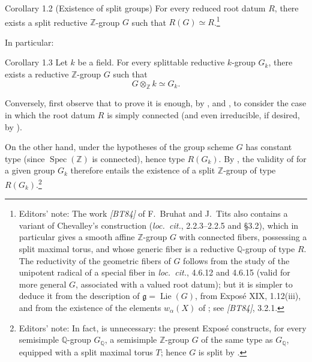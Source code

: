 \begin{sgastatement}{Corollary 1.2 (Existence of split groups)}
For every reduced root datum \(R\), there exists a split reductive
\(\mathbb Z\)-group \(G\) such that \(R(G)\simeq R\).\footnote{Editors' note:
The work \emph{[BT84]} of F.~Bruhat and J.~Tits also contains a variant of
Chevalley's construction (\emph{loc.\ cit.}, 2.2.3--2.2.5 and \S3.2), which
in particular gives a smooth affine \(\mathbb Z\)-group \(G\) with connected
fibers, possessing a split maximal torus, and whose generic fiber is a reductive
\(\mathbb Q\)-group of type \(R\). The reductivity of the geometric fibers of
\(G\) follows from the study of the unipotent radical of a special fiber in
\emph{loc.\ cit.}, 4.6.12 and 4.6.15 (valid for more general \(G\), associated
with a valued root datum); but it is simpler to deduce it from the description
of \(\mathfrak g=\operatorname{Lie}(G)\), from Exposé XIX, 1.12(iii), and from
the existence of the elements \(w_\alpha(X)\) of ; see
\emph{[BT84]}, 3.2.1.}
\end{sgastatement}

In particular:

\begin{sgastatement}{Corollary 1.3}
Let \(k\) be a field. For every splittable reductive \(k\)-group \(G_k\), there
exists a reductive \(\mathbb Z\)-group \(G\) such that
\[
  G\otimes_{\mathbb Z}k\simeq G_k.
\]
\end{sgastatement}

Conversely, first observe that to prove  it is enough, by ,
and , to consider the case in which the root datum \(R\) is
simply connected (and even irreducible, if desired, by ).

On the other hand, under the hypotheses of  the group scheme \(G\) has
constant type (since \(\operatorname{Spec}(\mathbb Z)\) is connected), hence type
\(R(G_k)\). By , the validity of  for a given group \(G_k\)
therefore entails the existence of a split \(\mathbb Z\)-group of type
\(R(G_k)\).\footnote{Editors' note: In fact,  is unnecessary:
the present Exposé constructs, for every semisimple \(\mathbb Q\)-group
\(G_{\mathbb Q}\), a semisimple \(\mathbb Z\)-group \(G\) of the same type as
\(G_{\mathbb Q}\), equipped with a split maximal torus \(T\); hence \(G\) is
split by .}

